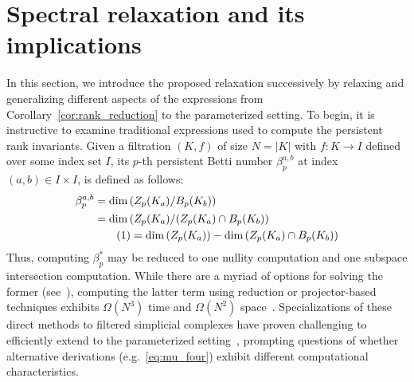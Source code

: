\documentclass[10pt]{article}
\numberwithin{equation}{section}
\newcommand{\+}{%
	\raisebox{0.18ex}{\scaleobj{0.55}{+}}
}
\theoremstyle{definition}
\theoremstyle{definition}
\newcommand\numberthis{\addtocounter{equation}{1}\tag{\theequation}}
\begin{document}
\section{Spectral relaxation and its implications}\label{sec:spectral_sec}
In this section, we introduce the proposed relaxation successively by relaxing and generalizing different aspects of the expressions from Corollary~\ref{cor:rank_reduction} to the parameterized setting. To begin, it is instructive to examine  traditional expressions used to compute the persistent rank invariants. 
Given a filtration $(K,f)$ of size $N = \lvert K\rvert$ with $f: K \to I$ defined over some index set $I$, its $p$-th persistent Betti number $\beta_p^{a,b}$ at index $(a,b) \in I \times I$, is defined as follows: 
\begin{align*} \label{eq:pbn}
	\centering
	\beta_p^{a,b } &= \mathrm{dim} \left ( Z_p(K_a) / B_p(K_b) \right ) \\
	& = \mathrm{dim} \left( Z_p(K_a) / (Z_p(K_a) \cap B_p(K_b) \right) \\
	& \numberthis = \mathrm{dim} \left( Z_p(K_a) \right) - \mathrm{dim}\left( Z_p(K_a) \cap B_p(K_b) \right ) 
\end{align*}
Thus, computing $\beta_p^\ast$ may be reduced to one nullity computation and one subspace intersection computation. %
While there are a myriad of options for solving the former (see~\cite{chen2011output}), computing the latter term using reduction or projector-based techniques exhibits $\Omega(N^3)$ time and $\Omega(N^2)$ space~\cite{golub2013matrix}.
Specializations of these direct methods to filtered simplicial complexes have proven challenging to efficiently extend to the parameterized setting~\cite{piekenbrock2021move}, prompting questions of whether alternative derivations (e.g.~\eqref{eq:mu_four}) exhibit different computational characteristics.
\end{document}
